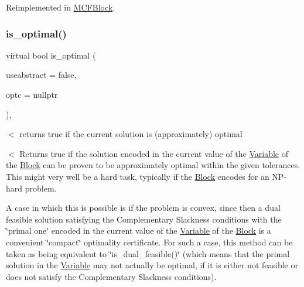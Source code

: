 Reimplemented in \mbox{\hyperlink{class_s_m_spp__di__unipi__it_1_1_m_c_f_block_a162cd7d8375d705f0b15d8e847098763}{M\+C\+F\+Block}}.

\mbox{\label{class_s_m_spp__di__unipi__it_1_1_block_a44ef42401ecae613574f3df619480de1}} 
\subsubsection{\texorpdfstring{is\+\_\+optimal()}{is\_optimal()}}
{\footnotesize\ttfamily virtual bool is\+\_\+optimal (\begin{DoxyParamCaption}\item[{bool}]{useabstract = {\ttfamily false},  }\item[{\mbox{\hyperlink{class_s_m_spp__di__unipi__it_1_1_configuration}{Configuration}} $\ast$}]{optc = {\ttfamily nullptr} }\end{DoxyParamCaption})\hspace{0.3cm}{\ttfamily [inline]}, {\ttfamily [virtual]}}



$<$ returns true if the current solution is (approximately) optimal 

$<$ Returns true if the solution encoded in the current value of the \mbox{\hyperlink{class_s_m_spp__di__unipi__it_1_1_variable}{Variable}} of the \mbox{\hyperlink{class_s_m_spp__di__unipi__it_1_1_block}{Block}} can be proven to be approximately optimal within the given tolerances. This might very well be a hard task, typically if the \mbox{\hyperlink{class_s_m_spp__di__unipi__it_1_1_block}{Block}} encodes for an N\+P-\/hard problem.

A case in which this is possible is if the problem is convex, since then a dual feasible solution satisfying the Complementary Slackness conditions with the \char`\"{}primal one\char`\"{} encoded in the current value of the \mbox{\hyperlink{class_s_m_spp__di__unipi__it_1_1_variable}{Variable}} of the \mbox{\hyperlink{class_s_m_spp__di__unipi__it_1_1_block}{Block}} is a convenient \char`\"{}compact\char`\"{} optimality certificate. For such a case, this method can be taken as being equivalent to \char`\"{}is\+\_\+dual\+\_\+feasible()\char`\"{} (which means that the primal solution in the \mbox{\hyperlink{class_s_m_spp__di__unipi__it_1_1_variable}{Variable}} may not actually be optimal, if it is either not feasible or does not satisfy the Complementary Slackness conditions).

